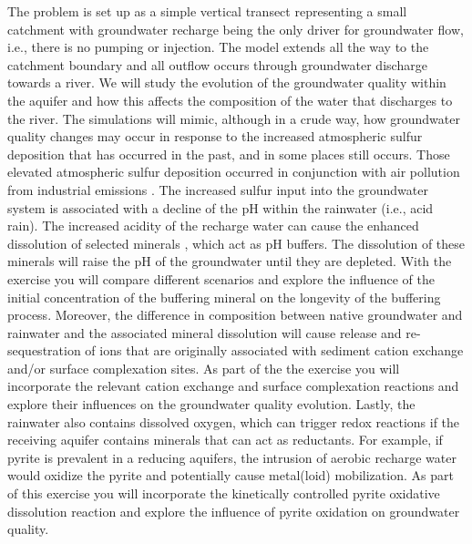 The problem is set up as a simple vertical transect representing a small catchment with 
groundwater recharge being the only driver for groundwater flow, i.e., there is no pumping or injection.
The model extends all the way to the catchment boundary and all outflow occurs through groundwater discharge
towards a river. We will study the evolution of the groundwater quality within the aquifer and how this affects   
the composition of the water that discharges to the river. 
The simulations will mimic, although in a crude way, how groundwater quality changes may occur in response to the increased atmospheric sulfur deposition \citep{ISI:000179120500001} that has occurred in the past, and in some places still occurs. 
Those elevated atmospheric sulfur deposition  occurred in conjunction 
with air pollution from industrial emissions \citep{ISI:000266220900013,ISI:000084664000003}. 
The increased sulfur input into the groundwater system is associated with a decline of the pH within the 
rainwater (i.e., acid rain). The increased acidity of the recharge water can cause the enhanced dissolution of selected minerals \citep{ISI:000455694400029}, which act as pH buffers. The dissolution of these minerals will raise the pH of the groundwater until they are depleted. With the exercise you will compare different scenarios and explore the influence of the initial concentration of the buffering mineral on the longevity of the buffering process. Moreover, the difference in composition between native groundwater and rainwater and the associated mineral dissolution will cause release and re-sequestration of ions that are originally associated with sediment cation exchange and/or surface complexation sites. As part of the the exercise you will incorporate the relevant cation exchange and surface complexation reactions and explore their influences on the groundwater quality evolution. Lastly, the rainwater also contains dissolved oxygen, which can trigger redox reactions if the receiving aquifer contains minerals that can act as reductants. For example, if pyrite is prevalent in a reducing aquifers, the intrusion of aerobic recharge water would oxidize the pyrite and potentially cause metal(loid) mobilization. As part of this exercise you will incorporate the kinetically controlled pyrite oxidative dissolution reaction and explore the influence of pyrite oxidation on groundwater quality.
